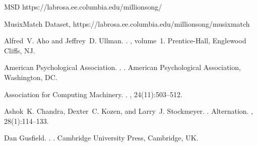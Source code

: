 \documentclass[11pt]{article}
\begin{document}
\begin{thebibliography}{}

  
\newblock MSD
\newblock https://labrosa.ee.columbia.edu/millionsong/

MusixMatch Dataset, https://labrosa.ee.columbia.edu/millionsong/musixmatch

Alfred~V. Aho and Jeffrey~D. Ullman.
.
, volume~1.
\newblock Prentice-{Hall}, Englewood Cliffs, NJ.

{American Psychological Association}.
.
.
\newblock American Psychological Association, Washington, DC.

{Association for Computing Machinery}.
.
, 24(11):503--512.

Ashok~K. Chandra, Dexter~C. Kozen, and Larry~J. Stockmeyer.
.
\newblock Alternation.
,
  28(1):114--133.

Dan Gusfield.
.
.
\newblock Cambridge University Press, Cambridge, UK.

\end{thebibliography}
\end{document}
